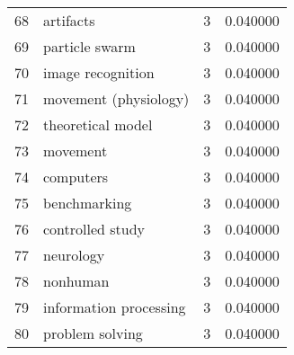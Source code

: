 \begin{tabular}{llrr}
68 &                                artifacts &           3 &    0.040000 \\
69 &                           particle swarm &           3 &    0.040000 \\
70 &                        image recognition &           3 &    0.040000 \\
71 &                    movement (physiology) &           3 &    0.040000 \\
72 &                        theoretical model &           3 &    0.040000 \\
73 &                                 movement &           3 &    0.040000 \\
74 &                                computers &           3 &    0.040000 \\
75 &                             benchmarking &           3 &    0.040000 \\
76 &                         controlled study &           3 &    0.040000 \\
77 &                                neurology &           3 &    0.040000 \\
78 &                                 nonhuman &           3 &    0.040000 \\
79 &                   information processing &           3 &    0.040000 \\
80 &                          problem solving &           3 &    0.040000 \\
\bottomrule
\end{tabular}
